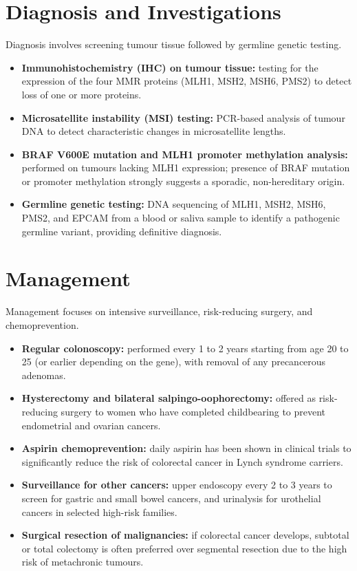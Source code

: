 \section*{Diagnosis and Investigations}
Diagnosis involves screening tumour tissue followed by germline genetic testing.
\begin{itemize}
    \item \textbf{Immunohistochemistry (IHC) on tumour tissue:} testing for the expression of the four MMR proteins (MLH1, MSH2, MSH6, PMS2) to detect loss of one or more proteins.
    \item \textbf{Microsatellite instability (MSI) testing:} PCR-based analysis of tumour DNA to detect characteristic changes in microsatellite lengths.
    \item \textbf{BRAF V600E mutation and MLH1 promoter methylation analysis:} performed on tumours lacking MLH1 expression; presence of BRAF mutation or promoter methylation strongly suggests a sporadic, non-hereditary origin.
    \item \textbf{Germline genetic testing:} DNA sequencing of MLH1, MSH2, MSH6, PMS2, and EPCAM from a blood or saliva sample to identify a pathogenic germline variant, providing definitive diagnosis.
\end{itemize}

\section*{Management}
Management focuses on intensive surveillance, risk-reducing surgery, and chemoprevention.
\begin{itemize}
    \item \textbf{Regular colonoscopy:} performed every 1 to 2 years starting from age 20 to 25 (or earlier depending on the gene), with removal of any precancerous adenomas.
    \item \textbf{Hysterectomy and bilateral salpingo-oophorectomy:} offered as risk-reducing surgery to women who have completed childbearing to prevent endometrial and ovarian cancers.
    \item \textbf{Aspirin chemoprevention:} daily aspirin has been shown in clinical trials to significantly reduce the risk of colorectal cancer in Lynch syndrome carriers.
    \item \textbf{Surveillance for other cancers:} upper endoscopy every 2 to 3 years to screen for gastric and small bowel cancers, and urinalysis for urothelial cancers in selected high-risk families.
    \item \textbf{Surgical resection of malignancies:} if colorectal cancer develops, subtotal or total colectomy is often preferred over segmental resection due to the high risk of metachronic tumours.
\end{itemize}

